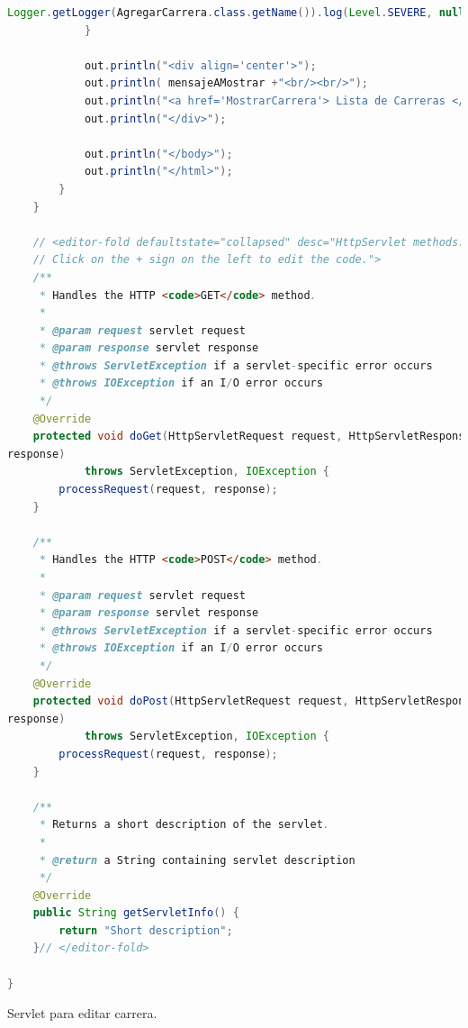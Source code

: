 \documentclass[a4paper,12pt]{article}
\begin{document}
\begin{lstlisting}[language=Java, style=customJava, 
caption={AgregarCarrera.java},captionpos=b,basicstyle=\fontfamily{cmss}\small]
Logger.getLogger(AgregarCarrera.class.getName()).log(Level.SEVERE, null, ex);
            }

            out.println("<div align='center'>");
            out.println( mensajeAMostrar +"<br/><br/>");
            out.println("<a href='MostrarCarrera'> Lista de Carreras </a>");
            out.println("</div>");

            out.println("</body>");
            out.println("</html>");
        }
    }

    // <editor-fold defaultstate="collapsed" desc="HttpServlet methods. 
    // Click on the + sign on the left to edit the code.">
    /**
     * Handles the HTTP <code>GET</code> method.
     *
     * @param request servlet request
     * @param response servlet response
     * @throws ServletException if a servlet-specific error occurs
     * @throws IOException if an I/O error occurs
     */
    @Override
    protected void doGet(HttpServletRequest request, HttpServletResponse 
response)
            throws ServletException, IOException {
        processRequest(request, response);
    }

    /**
     * Handles the HTTP <code>POST</code> method.
     *
     * @param request servlet request
     * @param response servlet response
     * @throws ServletException if a servlet-specific error occurs
     * @throws IOException if an I/O error occurs
     */
    @Override
    protected void doPost(HttpServletRequest request, HttpServletResponse 
response)
            throws ServletException, IOException {
        processRequest(request, response);
    }

    /**
     * Returns a short description of the servlet.
     *
     * @return a String containing servlet description
     */
    @Override
    public String getServletInfo() {
        return "Short description";
    }// </editor-fold>

}
\end{lstlisting}

Servlet para editar carrera.
\end{document}
